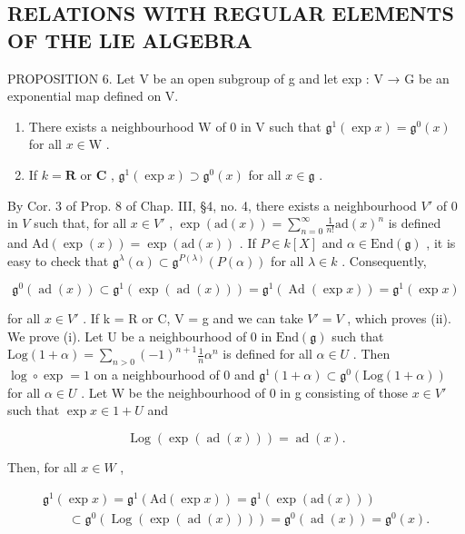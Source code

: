 \subsection{RELATIONS WITH REGULAR ELEMENTS OF THE LIE ALGEBRA}

PROPOSITION 6. Let V be an open subgroup of g and let exp : V → G be an exponential map defined on V.

\begin{enumerate}
\def\labelenumi{(\roman{enumi})}
\item
  There exists a neighbourhood \(\mathrm{W}\) of 0 in \(\mathrm{V}\) such that \(\mathfrak{g}^1(\exp x) = \mathfrak{g}^0(x)\) for all \(x \in \mathrm{W}\) .
\item
  If \(k = \mathbf{R}\) or \(\mathbf{C}\) , \(\mathfrak{g}^1(\exp x) \supset \mathfrak{g}^0(x)\) for all \(x \in \mathfrak{g}\) .
\end{enumerate}

By Cor. 3 of Prop. 8 of Chap. III, §4, no. 4, there exists a neighbourhood \(V'\) of 0 in \(V\) such that, for all \(x \in V'\) , \(\exp(\mathrm{ad}(x)) = \sum_{n=0}^{\infty} \frac{1}{n!} \mathrm{ad}(x)^n\) is defined and \(\mathrm{Ad}(\exp(x)) = \exp(\mathrm{ad}(x))\) . If \(P \in k[X]\) and \(\alpha \in \mathrm{End}(\mathfrak{g})\) , it is easy to check that \(\mathfrak{g}^\lambda(\alpha) \subset \mathfrak{g}^{P(\lambda)}(P(\alpha))\) for all \(\lambda \in k\) . Consequently,

\[
\mathfrak {g} ^ {0} (\operatorname{ad} (x)) \subset \mathfrak {g} ^ {1} (\exp (\operatorname{ad} (x))) = \mathfrak {g} ^ {1} (\operatorname{Ad} (\exp x)) = \mathfrak {g} ^ {1} (\exp x)
\]

for all \(x \in V'\) . If k = R or C, V = g and we can take \(V' = V\) , which proves (ii). We prove (i). Let U be a neighbourhood of 0 in \(\text{End}(\mathfrak{g})\) such that \(\text{Log}(1 + \alpha) = \sum_{n > 0} (-1)^{n+1} \frac{1}{n} \alpha^n\) is defined for all \(\alpha \in U\) . Then \(\log \circ \exp = 1\) on a neighbourhood of 0 and \(\mathfrak{g}^1(1 + \alpha) \subset \mathfrak{g}^0 (\text{Log}(1 + \alpha))\) for all \(\alpha \in U\) . Let W be the neighbourhood of 0 in g consisting of those \(x \in V'\) such that \(\exp x \in 1 + U\) and

\[
\operatorname{Log} (\exp (\operatorname{ad} (x))) = \operatorname{ad} (x).
\]

Then, for all \(x \in W\) ,

\[
\begin{array}{c} \mathfrak {g} ^ {1} (\exp x) = \mathfrak {g} ^ {1} (\mathrm{Ad} (\exp x)) = \mathfrak {g} ^ {1} (\exp (\mathrm{ad} (x))) \\ \qquad \subset \mathfrak {g} ^ {0} (\operatorname{Log} (\exp (\operatorname{ad} (x)))) = \mathfrak {g} ^ {0} (\operatorname{ad} (x)) = \mathfrak {g} ^ {0} (x). \end{array}
\]

